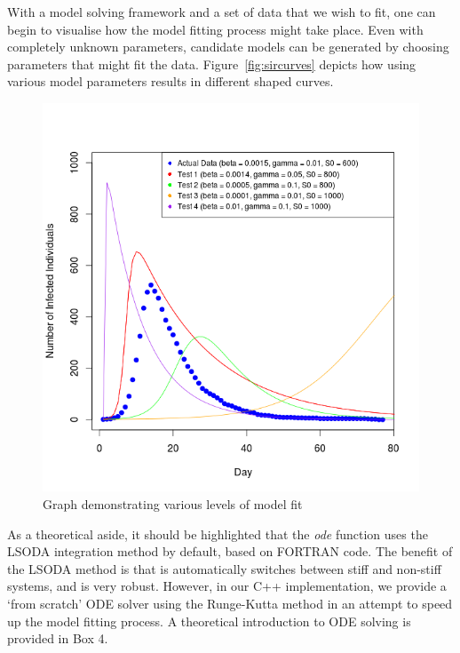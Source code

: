   
With a model solving framework and a set of data that we wish to fit,
one can begin to visualise how the model fitting process might take
place. Even with completely unknown parameters, candidate models can
be generated by choosing parameters that might fit the
data. Figure~\ref{fig:sircurves} depicts how using various model
parameters results in different
shaped curves. 

\begin{center}
\begin{figure}[ht!]

\includegraphics[width=15cm]{Rplot01.png}
\caption{Graph demonstrating various levels of model fit}
\label{sircurves}
\end{figure}  
\end{center}

As a theoretical aside, it should be highlighted that the
\emph{ode} function uses the LSODA integration method by default,
based on FORTRAN code. The benefit of the LSODA method is that is
automatically switches between stiff and non-stiff systems, and is
very robust. However, in our C++ implementation, we provide a `from
scratch' ODE solver using the Runge-Kutta method in an attempt to
speed up the model fitting process. A theoretical introduction to ODE
solving is provided in Box 4.  

